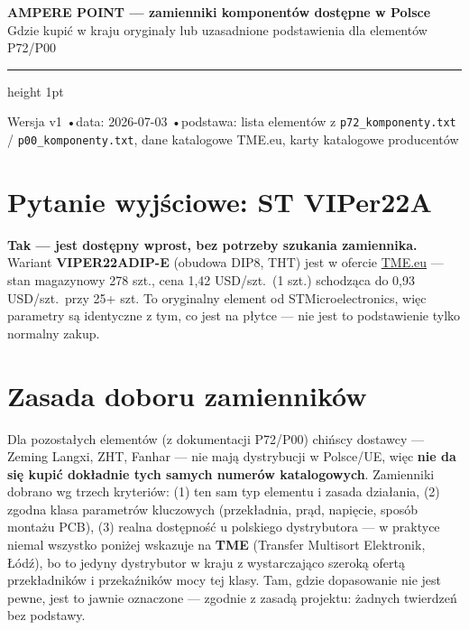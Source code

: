 \documentclass[11pt]{article}
\newcommand{\key}[1]{\textbf{\color{navy}#1}}
\newcommand{\ok}[1]{\textbf{\color{good}#1}}
\begin{document}
{\sffamily\bfseries\color{navy}\LARGE AMPERE POINT — zamienniki komponentów dostępne w Polsce}\\[3pt]
{\sffamily\large\color{navy} Gdzie kupić w kraju oryginały lub uzasadnione podstawienia dla elementów P72/P00}\\[6pt]
{\color{rulegrey}\hrule height 1pt}\vspace{4pt}
{\footnotesize\sffamily Wersja v1 \quad•\quad data: 2026-07-03 \quad•\quad podstawa: lista elementów z \texttt{p72\_komponenty.txt} / \texttt{p00\_komponenty.txt}, dane katalogowe TME.eu, karty katalogowe producentów}\\[2pt]

\section{Pytanie wyjściowe: ST VIPer22A}
\ok{Tak — jest dostępny wprost, bez potrzeby szukania zamiennika.} Wariant \key{VIPER22ADIP-E} (obudowa DIP8, THT) jest w ofercie \href{https://www.tme.eu/en/details/viper22adip-e/voltage-regulators-pwm-circuits/stmicroelectronics/}{TME.eu} — stan magazynowy 278 szt., cena 1,42 USD/szt.\ (1 szt.) schodząca do 0,93 USD/szt.\ przy 25+ szt. To oryginalny element od STMicroelectronics, więc parametry są identyczne z tym, co jest na płytce — nie jest to podstawienie tylko normalny zakup.

\section{Zasada doboru zamienników}
Dla pozostałych elementów (z dokumentacji P72/P00) chińscy dostawcy — Zeming Langxi, ZHT, Fanhar — nie mają dystrybucji w Polsce/UE, więc \key{nie da się kupić dokładnie tych samych numerów katalogowych}. Zamienniki dobrano wg trzech kryteriów: (1) ten sam typ elementu i zasada działania, (2) zgodna klasa parametrów kluczowych (przekładnia, prąd, napięcie, sposób montażu PCB), (3) realna dostępność u polskiego dystrybutora — w praktyce niemal wszystko poniżej wskazuje na \key{TME} (Transfer Multisort Elektronik, Łódź), bo to jedyny dystrybutor w kraju z wystarczająco szeroką ofertą przekładników i przekaźników mocy tej klasy. Tam, gdzie dopasowanie nie jest pewne, jest to jawnie oznaczone — zgodnie z zasadą projektu: żadnych twierdzeń bez podstawy.
\end{document}
